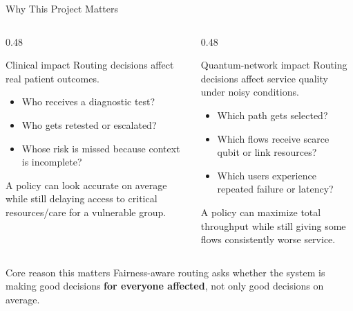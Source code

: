 \documentclass[aspectratio=169,10pt]{beamer}
\begin{document}
\begin{frame}{Why This Project Matters}
\begin{columns}[T]
\begin{column}{0.48\textwidth}
\begin{block}{Clinical impact}
Routing decisions affect real patient outcomes.
\end{block}

\begin{itemize}
    \item Who receives a diagnostic test?
    \item Who gets retested or escalated?
    \item Whose risk is missed because context is incomplete?
\end{itemize}

\vspace{0.4em}

\alert{A policy can look accurate on average while still delaying access to critical resources/care for a vulnerable group.}
\end{column}

\begin{column}{0.48\textwidth}
\begin{block}{Quantum-network impact}
Routing decisions affect service quality under noisy conditions.
\end{block}

\begin{itemize}
    \item Which path gets selected?
    \item Which flows receive scarce qubit or link resources?
    \item Which users experience repeated failure or latency?
\end{itemize}

\vspace{0.4em}

\alert{A policy can maximize total throughput while still giving some flows consistently worse service.}
\end{column}
\end{columns}

\vspace{0.6em}

\begin{block}{Core reason this matters}
Fairness-aware routing asks whether the system is making good decisions
\textbf{for everyone affected}, not only good decisions on average.
\end{block}
\end{frame}
\end{document}
